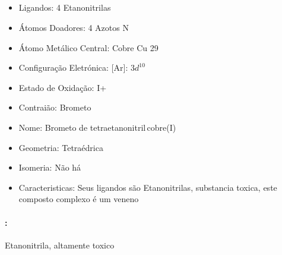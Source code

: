 \documentclass[12pt]{article}
\begin{document}
	\subsection{}
	\begin{itemize}
   
   
   \item Ligandos: 4 Etanonitrilas
   
   
   \item Átomos Doadores: 4 Azotos N
   
   \item Átomo Metálico Central: Cobre Cu 29
   
   \item Configuração Eletrónica: [Ar]: $ 3d^{10} $
   
   \item Estado de Oxidação: I+
    
   \item Contraião: Brometo 
   
   \item Nome: Brometo de tetraetanonitril\,cobre(I)
   
   \item Geometria: Tetraédrica
   
   \item Isomeria: Não há

	\item Caracteristicas: Seus ligandos são Etanonitrilas, substancia toxica, este composto complexo é um veneno
	
	\end{itemize}

\paragraph{:} Etanonitrila, altamente toxico
	
\break


	
\end{document}

